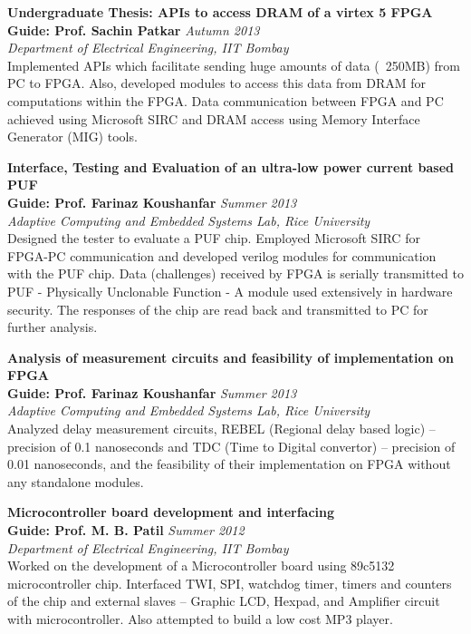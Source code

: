 \documentclass[margin,line]{resume}
\begin{document}
\begin{resume}
	{\bf  Undergraduate Thesis: APIs to access DRAM of a virtex 5 FPGA} \\
	{\bf Guide: Prof. Sachin Patkar} 	\hfill \textit{Autumn 2013} \\
	{\it Department of Electrical Engineering, IIT Bombay}\\
	Implemented APIs which facilitate sending huge amounts of data (~250MB) from PC to FPGA. Also, developed  modules to access this data from DRAM for computations within the FPGA. Data communication between FPGA and PC achieved using Microsoft SIRC and DRAM access using Memory Interface Generator (MIG) tools.
	
    {\bf Interface, Testing and Evaluation of an ultra-low power current based PUF} \\
    {\bf Guide: Prof. Farinaz Koushanfar} \hfill \textit{Summer 2013} \\
    {\it Adaptive Computing and Embedded Systems Lab, Rice University} \\
	Designed the tester to evaluate a PUF chip. Employed Microsoft SIRC for FPGA-PC communication and developed verilog modules for communication with the PUF chip. Data (challenges) received by FPGA is serially transmitted to PUF - Physically Unclonable Function - A module used extensively in hardware security. The responses of the chip are read back and transmitted to PC for further analysis.
	
    {\bf Analysis of measurement circuits and feasibility of implementation on FPGA} \\
    {\bf Guide: Prof. Farinaz Koushanfar} \hfill \textit{Summer 2013} \\
    {\it Adaptive Computing and Embedded Systems Lab, Rice University} \\
    Analyzed delay measurement circuits, REBEL (Regional delay based  logic) – precision of 0.1 nanoseconds and TDC (Time to Digital convertor) – precision of 0.01 nanoseconds, and the feasibility of their implementation on FPGA without any standalone modules.
    
	\pagebreak
	
    {\bf Microcontroller board development and interfacing} \\
    {\bf Guide: Prof. M. B. Patil} 	\hfill \textit{Summer 2012} \\
    {\it Department of Electrical Engineering, IIT Bombay}\\
	Worked on the development of a Microcontroller board using 89c5132 microcontroller chip. Interfaced TWI, SPI, watchdog timer, timers and counters of the chip and external slaves – Graphic LCD, Hexpad, and Amplifier circuit with microcontroller. Also attempted to build a low cost MP3 player.
	

\end{resume}
\end{document}
